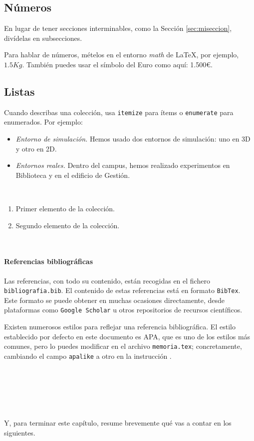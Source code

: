 \subsection{Números}
\label{sec:subseccion}

En lugar de tener secciones interminables, como la Sección \ref{sec:miseccion}, divídelas en subsecciones.

Para hablar de números, mételos en el entorno \textit{math} de \LaTeX, por ejemplo, $1.5Kg$. También puedes usar el símbolo del Euro como aquí: 1.500\euro.

\subsection{Listas}

Cuando describas una colección, usa \texttt{itemize} para ítems o \texttt{enumerate} para enumerados. Por ejemplo:

\begin{itemize}
 \item \textit{Entorno de simulación.} Hemos usado dos entornos de simulación: uno en 3D y otro en 2D.
 \item \textit{Entornos reales.} Dentro del campus, hemos realizado experimentos en Biblioteca y en el edificio de Gestión.
\end{itemize}\

\begin{enumerate}
 \item Primer elemento de la colección.
 \item Segundo elemento de la colección.
\end{enumerate}\

\paragraph{Referencias bibliográficas}
\label{sec:referencias}


Las referencias, con todo su contenido, están recogidas en el fichero \texttt{bibliografia.bib}. El contenido de estas referencias está en formato \texttt{BibTex}. Este formato se puede obtener en muchas ocasiones directamente, desde plataformas como \texttt{Google Scholar} u otros repositorios de recursos científicos.

Existen numerosos estilos para reflejar una referencia bibliográfica. El estilo establecido por defecto en este documento es APA, que es uno de los estilos más comunes, pero lo puedes modificar en el archivo \texttt{memoria.tex}; concretamente, cambiando el campo \verb|apalike| a otro en la instrucción \verb||. 

\

\

\

Y, para terminar este capítulo, resume brevemente qué vas a contar en los siguientes.
